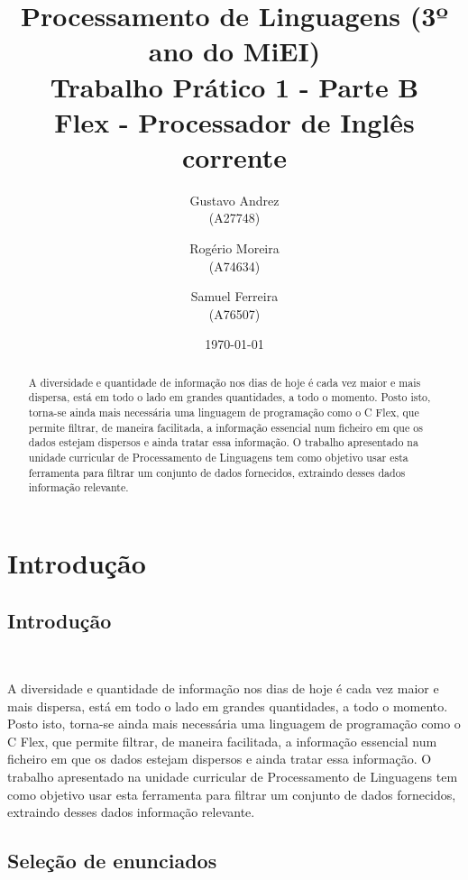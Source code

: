 \documentclass{report}
\title{Processamento de Linguagens (3º ano do MiEI)\\ \textbf{Trabalho Prático 1 - Parte B}\\ Flex - Processador de Inglês corrente}
\author{Gustavo Andrez\\ (A27748) \and Rogério Moreira\\ (A74634) \and Samuel Ferreira\\ (A76507) }
\date{\today}
\begin{document}
\maketitle

\begin{abstract}

A diversidade e quantidade de informação nos dias de hoje é cada vez maior e mais dispersa, está em todo o lado em grandes quantidades, a todo o momento. Posto isto, torna-se ainda mais necessária uma linguagem de programação como o C Flex, que permite filtrar, de maneira facilitada, a informação essencial num ficheiro em que os dados estejam dispersos e ainda tratar essa informação. O trabalho apresentado na unidade curricular de Processamento de Linguagens tem como objetivo usar esta ferramenta para filtrar um conjunto de dados fornecidos, extraindo desses dados informação relevante.

\end{abstract}

\tableofcontents

\chapter{Introdu\c{c}\~ao} \label{intro}

\section*{Introdu\c{c}\~ao} \

A diversidade e quantidade de informação nos dias de hoje é cada vez maior e mais dispersa, está em todo o lado em grandes quantidades, a todo o momento. Posto isto, torna-se ainda mais necessária uma linguagem de programação como o C Flex, que permite filtrar, de maneira facilitada, a informação essencial num ficheiro em que os dados estejam dispersos e ainda tratar essa informação. O trabalho apresentado na unidade curricular de Processamento de Linguagens tem como objetivo usar esta ferramenta para filtrar um conjunto de dados fornecidos, extraindo desses dados informação relevante.

\section*{Sele\c{c}\~ao de enunciados} \
\end{document}
